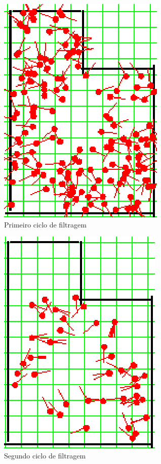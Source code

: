 \begin{figure}[H]
  \centering
  \includegraphics[scale=1]{figuras/cen1_ex2/2.eps}
  \caption[Primeiro Ciclo de Filtragem]{Primeiro ciclo de filtragem}
  \label{img:cen1_ex2_2}
\end{figure}

\begin{figure}[H]
  \centering
  \includegraphics[scale=1]{figuras/cen1_ex2/3.eps}
  \caption[Segundo Ciclo de Filtragem]{Segundo ciclo de filtragem}
  \label{img:cen1_ex2_3}
\end{figure}

